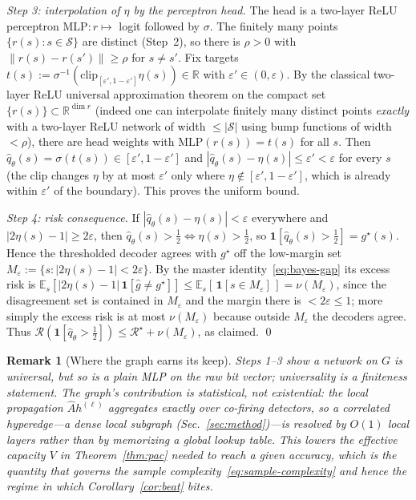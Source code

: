 \documentclass[aps,prxquantum,twocolumn,superscriptaddress,nofootinbib,longbibliography]{revtex4-2}
\newtheorem{remark}{Remark}
\newcommand{\R}{\mathbb{R}}
\newcommand{\E}{\mathbb{E}}
\newcommand{\eps}{\varepsilon}
\newcommand{\norm}[1]{\left\lVert #1 \right\rVert}
\newcommand{\ind}[1]{\mathbf{1}\!\left[#1\right]}
\newcommand{\cS}{\mathcal{S}}
\newcommand{\Risk}{\mathcal{R}}
\begin{document}
\emph{Step 3: interpolation of $\eta$ by the perceptron head.}
The head is a two-layer ReLU perceptron $\mathrm{MLP}:r\mapsto$ logit followed by
$\sigma$. The finitely many points $\{r(s):s\in\cS\}$ are distinct (Step~2), so
there is $\rho>0$ with $\norm{r(s)-r(s')}\ge\rho$ for $s\neq s'$. Fix targets
$t(s):=\sigma^{-1}(\mathrm{clip}_{[\eps',1-\eps']}\eta(s))\in\R$ with
$\eps'\in(0,\eps)$. By the classical two-layer ReLU universal approximation
theorem on the compact set $\{r(s)\}\subset\R^{\dim r}$ (indeed one can
interpolate finitely many distinct points \emph{exactly} with a two-layer ReLU
network of width $\le|\cS|$ using bump functions of width $<\rho$), there are head
weights with $\mathrm{MLP}(r(s))=t(s)$ for all $s$. Then
$\hat q_\theta(s)=\sigma(t(s))\in[\eps',1-\eps']$ and
$|\hat q_\theta(s)-\eta(s)|\le\eps'<\eps$ for every $s$ (the clip changes $\eta$
by at most $\eps'$ only where $\eta\notin[\eps',1-\eps']$, which is already within
$\eps'$ of the boundary). This proves the uniform bound.

\emph{Step 4: risk consequence.}
If $|\hat q_\theta(s)-\eta(s)|<\eps$ everywhere and $|2\eta(s)-1|\ge 2\eps$, then
$\hat q_\theta(s)>\tfrac12\Leftrightarrow\eta(s)>\tfrac12$, so
$\ind{\hat q_\theta(s)>\tfrac12}=g^\star(s)$. Hence the thresholded decoder agrees
with $g^\star$ off the low-margin set $M_\eps:=\{s:|2\eta(s)-1|<2\eps\}$. By the
master identity~\eqref{eq:bayes-gap} its excess risk is
$\E_s[|2\eta(s)-1|\,\ind{\hat g\neq g^\star}]\le
\E_s[\,\ind{s\in M_\eps}\,]=\nu(M_\eps)$, since the disagreement set is contained
in $M_\eps$ and the margin there is $<2\eps\le 1$; more simply the excess risk is
at most $\nu(M_\eps)$ because outside $M_\eps$ the decoders agree. Thus
$\Risk(\ind{\hat q_\theta>\tfrac12})\le\Risk^\star+\nu(M_\eps)$, as claimed.
\qed

\begin{remark}[Where the graph earns its keep]
Steps 1--3 show a network on $G$ is universal, but so is a plain MLP on the raw
bit vector; universality is a finiteness statement. The graph's contribution is
statistical, not existential: the local propagation $\hat A h^{(\ell)}$ aggregates
exactly over co-firing detectors, so a correlated hyperedge---a dense local
subgraph (Sec.~\ref{sec:method})---is resolved by $O(1)$ local layers rather than
by memorizing a global lookup table. This lowers the effective capacity $V$ in
Theorem~\ref{thm:pac} needed to reach a given accuracy, which is the quantity that
governs the sample complexity~\eqref{eq:sample-complexity} and hence the regime in
which Corollary~\ref{cor:beat} bites.
\end{remark}
\end{document}
